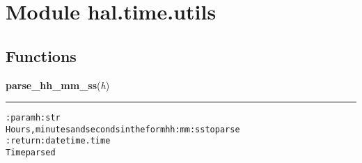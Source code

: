 %
%
%


\section{Module hal.time.utils}

    \label{hal:time:utils}


  \subsection{Functions}

    \label{hal:time:utils:parse_hh_mm_ss}

    \vspace{0.5ex}

\hspace{.8\funcindent}\begin{boxedminipage}{\funcwidth}

    \raggedright \textbf{parse\_hh\_mm\_ss}(\textit{h})

    \vspace{-1.5ex}

    \rule{\textwidth}{0.5\fboxrule}
\setlength{\parskip}{2ex}
\begin{alltt}

:param h: str
    Hours, minutes and seconds in the form hh:mm:ss to parse
:return: datetime.time
    Time parsed
\end{alltt}

\setlength{\parskip}{1ex}
    \end{boxedminipage}

    \label{hal:time:utils:get_seconds}

